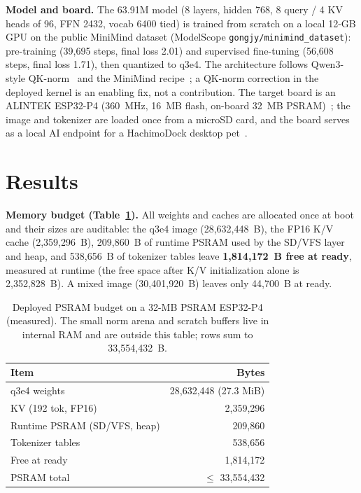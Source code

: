 \documentclass[journal,letterpaper]{IEEEtran}
\begin{document}
\textbf{Model and board.} The 63.91M model (8 layers, hidden 768, 8 query / 4 KV heads of 96,
FFN 2432, vocab 6400 tied) is trained from scratch on a local 12-GB GPU on the public MiniMind
dataset (ModelScope \texttt{gongjy/minimind\_dataset}): pre-training (39,695 steps, final loss
2.01) and supervised fine-tuning (56,608 steps, final loss 1.71), then quantized to q3e4. The
architecture follows Qwen3-style QK-norm~\cite{qwen3} and the MiniMind recipe~\cite{minimind};
a QK-norm correction in the deployed kernel is an enabling fix, not a contribution. The target
board is an ALINTEK ESP32-P4 (360~MHz, 16~MB flash, on-board 32~MB PSRAM)~\cite{psram}; the
image and tokenizer are loaded once from a microSD card, and the board serves as a local AI endpoint for a HachimoDock desktop pet~\cite{hachimodock}.


\section{Results}
\textbf{Memory budget (Table~\ref{tab:budget}).} All weights and caches are allocated once at
boot and their sizes are auditable: the q3e4 image (28,632,448~B), the FP16 K/V cache
(2,359,296~B), 209,860~B of runtime PSRAM used by the SD/VFS layer and heap, and 538,656~B of
tokenizer tables leave \textbf{1,814,172~B free at ready}, measured at runtime (the free space
after K/V initialization alone is 2,352,828~B). A mixed image (30,401,920~B) leaves only 44,700~B
at ready.

\begin{table}[t]
\centering
\caption{Deployed PSRAM budget on a 32-MB PSRAM ESP32-P4 (measured). The small norm arena and scratch buffers live in internal RAM and are outside this table; rows sum to 33,554,432~B.}
\label{tab:budget}
\footnotesize
\setlength{\tabcolsep}{2.5pt}
\begin{tabular}{@{}lr@{}}
\toprule
Item & Bytes \\
\midrule
q3e4 weights & 28,632,448 (27.3 MiB) \\
KV (192 tok, FP16) & 2,359,296 \\
Runtime PSRAM (SD/VFS, heap) & 209,860 \\
Tokenizer tables & 538,656 \\
\midrule
Free at ready & 1,814,172 \\
\midrule
PSRAM total & $\leq$ 33,554,432 \\
\bottomrule
\end{tabular}
\end{table}
\end{document}
